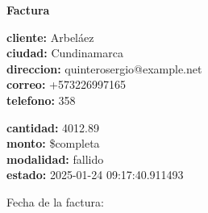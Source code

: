 \documentclass{article}
\begin{document}
\begin{center}
    {\LARGE \textbf{Factura}}\\[1cm]
\end{center}

\textbf{cliente:} Arbeláez \\
\textbf{ciudad:} Cundinamarca \\
\textbf{direccion:} quinterosergio@example.net \\
\textbf{correo:} +573226997165 \\
\textbf{telefono:} 358 \\

\vspace{0.5cm}

\textbf{cantidad:} 4012.89 \\
\textbf{monto:} \$completa \\
\textbf{modalidad:} fallido \\
\textbf{estado:} 2025-01-24 09:17:40.911493 \\

\vspace{1cm}

Fecha de la factura: 
\end{document}
